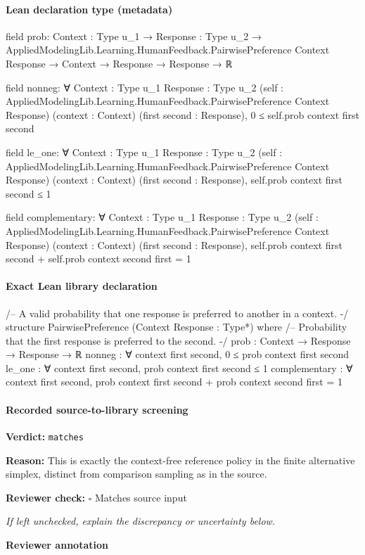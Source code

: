 \documentclass[10pt]{article}
\newcommand{\reviewerbox}{%
  \par\noindent\fbox{\parbox{0.96\linewidth}{\rule{0pt}{0.38in}}}\par
}
\newcommand{\reviewmatch}[1]{%
  \par\noindent\textbf{Reviewer check:} $\square$\; #1\par
  \noindent\emph{If left unchecked, explain the discrepancy or uncertainty below.}\par
}
\begin{document}
\paragraph{Lean declaration type (metadata)}
\begin{ReviewVerbatim}
field prob:
{Context : Type u_1} →
  {Response : Type u_2} →
    AppliedModelingLib.Learning.HumanFeedback.PairwisePreference Context Response → Context → Response → Response → ℝ

field nonneg:
∀ {Context : Type u_1} {Response : Type u_2}
  (self : AppliedModelingLib.Learning.HumanFeedback.PairwisePreference Context Response) (context : Context)
  (first second : Response), 0 ≤ self.prob context first second

field le_one:
∀ {Context : Type u_1} {Response : Type u_2}
  (self : AppliedModelingLib.Learning.HumanFeedback.PairwisePreference Context Response) (context : Context)
  (first second : Response), self.prob context first second ≤ 1

field complementary:
∀ {Context : Type u_1} {Response : Type u_2}
  (self : AppliedModelingLib.Learning.HumanFeedback.PairwisePreference Context Response) (context : Context)
  (first second : Response), self.prob context first second + self.prob context second first = 1
\end{ReviewVerbatim}

\paragraph{Exact Lean library declaration}
\begin{ReviewVerbatim}
/-- A valid probability that one response is preferred to another in a context. -/
structure PairwisePreference (Context Response : Type*) where
  /-- Probability that the first response is preferred to the second. -/
  prob : Context → Response → Response → ℝ
  nonneg : ∀ context first second, 0 ≤ prob context first second
  le_one : ∀ context first second, prob context first second ≤ 1
  complementary : ∀ context first second,
    prob context first second + prob context second first = 1
\end{ReviewVerbatim}

\paragraph{Recorded source-to-library screening}
\textbf{Verdict:} \texttt{matches}
\\
{\raggedright
\textbf{Reason:} This is exactly the context-\allowbreak{}free reference policy in the finite alternative simplex, distinct from comparison sampling as in the source.\allowbreak{}
\par}
\reviewmatch{Matches source input}
\noindent\textbf{Reviewer annotation}\par
\reviewerbox
\clearpage
\hypertarget{library-prerequisite-cf06d15d7f8b7c31}{}
\end{document}
